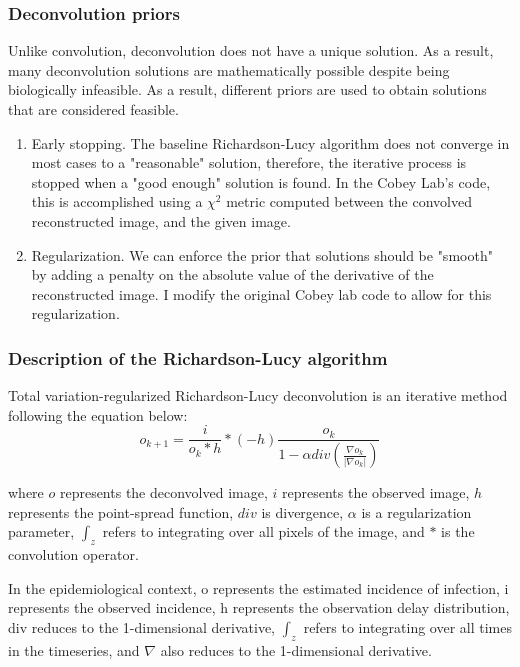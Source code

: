 \documentclass{article}
\begin{document}
\subsubsection{Deconvolution priors}
Unlike convolution, deconvolution does not have a unique solution. As a result, many deconvolution solutions are mathematically possible despite being biologically infeasible. As a result, different priors are used to obtain solutions that are considered feasible.

\begin{enumerate}
	\item Early stopping. The baseline Richardson-Lucy algorithm does not converge in most cases to a "reasonable" solution, therefore, the iterative process is stopped when a "good enough" solution is found. In the Cobey Lab's code, this is accomplished using a $\chi^2$ metric computed between the convolved reconstructed image, and the given image. 
	 \item Regularization. We can enforce the prior that solutions should be "smooth" by adding a penalty on the absolute value of the derivative of the reconstructed image. I modify the original Cobey lab code to allow for this regularization.
\end{enumerate}

\subsubsection{Description of the Richardson-Lucy algorithm}
Total variation-regularized Richardson-Lucy deconvolution is an iterative method following the equation below: \cite{RLLoss}
\begin{equation}
    o_{k+1} = \frac{i}{o_k * h} * (-h) \frac{o_k}{1-\alpha div(\frac{\nabla o_k}{|\nabla o_k|})}
\end{equation}

where $o$ represents the deconvolved image, $i$ represents the observed image, $h$ represents the point-spread function, $div$ is divergence, $\alpha$ is a regularization parameter, $\int_z$ refers to integrating over all pixels of the image, and $*$ is the convolution operator.

In the epidemiological context, o represents the estimated incidence of infection, i represents the observed incidence, h represents the observation delay distribution, div reduces to the 1-dimensional derivative, $\int_z$ refers to integrating over all times in the timeseries, and $\nabla$ also reduces to the 1-dimensional derivative.
\end{document}
